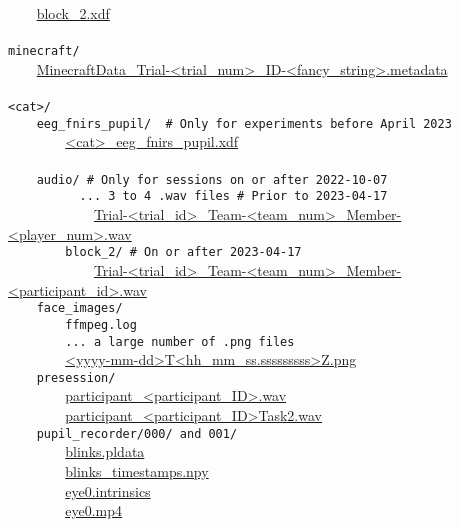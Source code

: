 \verb|    |\hyperref[block_2.xdf]{block\_2.xdf}\\\\
\verb|minecraft/|\\
\verb|    |\hyperref[MinecraftData_Trial-<trial_num>_ID-<fancy_string>.metadata]{MinecraftData\_Trial-<trial\_num>\_ID-<fancy\_string>.metadata}\\\\
\verb|<cat>/|\\
\verb|    eeg_fnirs_pupil/  # Only for experiments before April 2023|\\
\verb|        |\hyperref[<cat>_eeg_fnirs_pupil.xdf]{<cat>\_eeg\_fnirs\_pupil.xdf}\\\\
\verb|    audio/ # Only for sessions on or after 2022-10-07|\\
\verb|          ... 3 to 4 .wav files # Prior to 2023-04-17|\\
\verb|            |\hyperref[Trial-<trial_id>_Team-<team_num>_Member-<player_num>.wav]{Trial-<trial\_id>\_Team-<team\_num>\_Member-<player\_num>.wav}\\
\verb|        block_2/ # On or after 2023-04-17|\\
\verb|            |\hyperref[Trial-<trial_id>_Team-<team_num>_Member-<participant_id>.wav]{Trial-<trial\_id>\_Team-<team\_num>\_Member-<participant\_id>.wav}\\
\verb|    face_images/|\\
\verb|        ffmpeg.log|\\
\verb|        ... a large number of .png files|\\
\verb|        |\hyperref[face_images/<yyyy-mm-dd>T<hh_mm_ss.sssssssss>Z.png]{<yyyy-mm-dd>T<hh\_mm\_ss.sssssssss>Z.png}\\
\verb|    presession/|\\
\verb|        |\hyperref[participant_<participant_ID>.wav]{participant\_<participant\_ID>.wav}\\
\verb|        |\hyperref[participant_<participant_ID>Task2.wav]{participant\_<participant\_ID>Task2.wav}\\
\verb|    pupil_recorder/000/ and 001/|\\
\verb|        |\hyperref[blinks.pldata]{blinks.pldata}\\
\verb|        |\hyperref[blinks_timestamps.npy]{blinks\_timestamps.npy}\\
\verb|        |\hyperref[eye0.intrinsics]{eye0.intrinsics}\\
\verb|        |\hyperref[eye0.mp4]{eye0.mp4}\\
